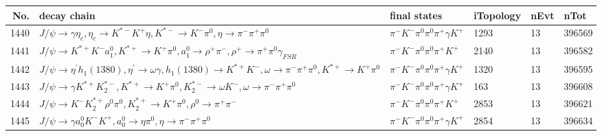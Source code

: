 \begin{table}[htbp] 
\begin{center}
\begin{small}
\begin{tabular}{rlllll}\hline\hline
 No. & decay chain & final states &  iTopology & nEvt & nTot \\\hline
1440&$J/\psi       \rightarrow \gamma       \eta_{c}    , \eta_{c}     \rightarrow K^{*-}         K^{+}          \eta          , K^{*-}          \rightarrow K^{-}          \pi^{0}        , \eta           \rightarrow \pi^{-}        \pi^{+}        \pi^{0}        $&$\pi^{-}        K^{-}          \pi^{0}        \pi^{0}        \pi^{+}        \gamma       K^{+}          $& 1293&   13&396569\\
1441&$J/\psi       \rightarrow K^{*+}         K^{-}          a_{1}^{0}      , K^{*+}          \rightarrow K^{+}          \pi^{0}        , a_{1}^{0}       \rightarrow \rho^{+}      \pi^{-}        , \rho^{+}       \rightarrow \pi^{+}        \pi^{0}        \gamma_{FSR} $&$\pi^{-}        K^{-}          \pi^{0}        \pi^{0}        \pi^{+}        K^{+}          $& 2140&   13&396582\\
1442&$J/\psi       \rightarrow \eta^{\prime} h_{1}(1380)    , \eta^{\prime}  \rightarrow \omega         \gamma       , h_{1}(1380)     \rightarrow K^{*+}         K^{-}          , \omega          \rightarrow \pi^{-}        \pi^{+}        \pi^{0}        , K^{*+}          \rightarrow K^{+}          \pi^{0}        $&$\pi^{-}        K^{-}          \pi^{0}        \pi^{0}        \pi^{+}        \gamma       K^{+}          $& 1320&   13&396595\\
1443&$J/\psi       \rightarrow \gamma       K^{*+}         K_2^{*-}       , K^{*+}          \rightarrow K^{+}          \pi^{0}        , K_2^{*-}        \rightarrow \omega         K^{-}          , \omega          \rightarrow \pi^{-}        \pi^{+}        \pi^{0}        $&$\pi^{-}        K^{-}          \pi^{0}        \pi^{0}        \pi^{+}        \gamma       K^{+}          $&  163&   13&396608\\
1444&$J/\psi       \rightarrow K^{-}          K_2^{*+}       \rho^{0}      \pi^{0}        , K_2^{*+}        \rightarrow K^{+}          \pi^{0}        , \rho^{0}       \rightarrow \pi^{+}        \pi^{-}        $&$\pi^{-}        K^{-}          \pi^{0}        \pi^{0}        \pi^{+}        K^{+}          $& 2853&   13&396621\\
1445&$J/\psi       \rightarrow \gamma       a_{0}^{0}      K^{-}          K^{+}          , a_{0}^{0}       \rightarrow \eta          \pi^{0}        , \eta           \rightarrow \pi^{-}        \pi^{+}        \pi^{0}        $&$\pi^{-}        K^{-}          \pi^{0}        \pi^{0}        \pi^{+}        \gamma       K^{+}          $& 2854&   13&396634\\

\end{tabular}
\end{small}
\end{center}
\end{table}
